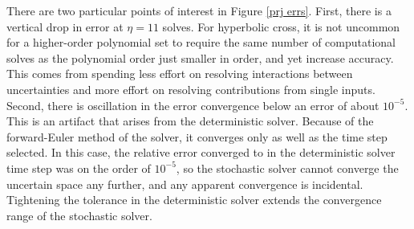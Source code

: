 \documentclass{mc2015}
\begin{document}
There are two particular points of interest in Figure \ref{prj errs}.  First, there is a vertical drop in error at $\eta=11$ solves.  For hyperbolic cross, it is not uncommon for a higher-order polynomial set to require the same number of computational solves as the polynomial order just smaller in order, and yet increase accuracy.  This comes from spending less effort on resolving interactions between uncertainties and more effort on resolving contributions from single inputs.  Second, there is oscillation in the error convergence below an error of about $10^{-5}$.  This is an artifact that arises from the deterministic solver.  Because of the forward-Euler method of the solver, it converges only as well as the time step selected.  In this case, the relative error converged to in the deterministic solver time step was on the order of $10^{-5}$, so the stochastic solver cannot converge the uncertain space any further, and any apparent convergence is incidental.  Tightening the tolerance in the deterministic solver extends the convergence range of the stochastic solver.
\end{document}
